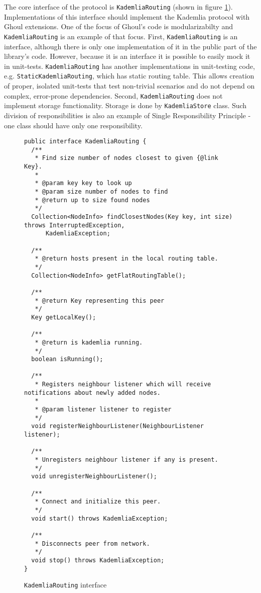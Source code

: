The core interface of the protocol is \texttt{KademliaRouting} (shown in figure \ref{fig:routing_interface}).
Implementations of this interface should implement the Kademlia protocol with Ghoul extensions.
One of the focus of Ghoul's code is modularizabilty and \texttt{KademliaRouting} is an example of that focus.
First, \texttt{KademliaRouting} is an interface, although there is only one implementation of it in the public part of the library's code.
However, because it is an interface it is possible to easily mock it in unit-tests.
\texttt{KademliaRouting} has another implementations in unit-testing code, e.g. \texttt{StaticKademliaRouting}, which has static routing table.
This allows creation of proper, isolated unit-tests that test non-trivial scenarios and do not depend on complex, error-prone dependencies.
Second, \texttt{KademliaRouting} does not implement storage functionality.
Storage is done by \texttt{KademliaStore} class.
Such division of responsibilities is also an example of Single Responsibility
Principle - one class should have only one responsibility.

\begin{figure}[tbp]
\begin{lstlisting}
public interface KademliaRouting {
  /**
   * Find size number of nodes closest to given {@link Key}.
   *
   * @param key key to look up
   * @param size number of nodes to find
   * @return up to size found nodes
   */
  Collection<NodeInfo> findClosestNodes(Key key, int size) throws InterruptedException,
      KademliaException;

  /**
   * @return hosts present in the local routing table.
   */
  Collection<NodeInfo> getFlatRoutingTable();

  /**
   * @return Key representing this peer
   */
  Key getLocalKey();

  /**
   * @return is kademlia running.
   */
  boolean isRunning();

  /**
   * Registers neighbour listener which will receive notifications about newly added nodes.
   *
   * @param listener listener to register
   */
  void registerNeighbourListener(NeighbourListener listener);

  /**
   * Unregisters neighbour listener if any is present.
   */
  void unregisterNeighbourListener();

  /**
   * Connect and initialize this peer.
   */
  void start() throws KademliaException;

  /**
   * Disconnects peer from network.
   */
  void stop() throws KademliaException;
}
\end{lstlisting}
\caption{\texttt{KademliaRouting} interface}
\label{fig:routing_interface}
\end{figure}

